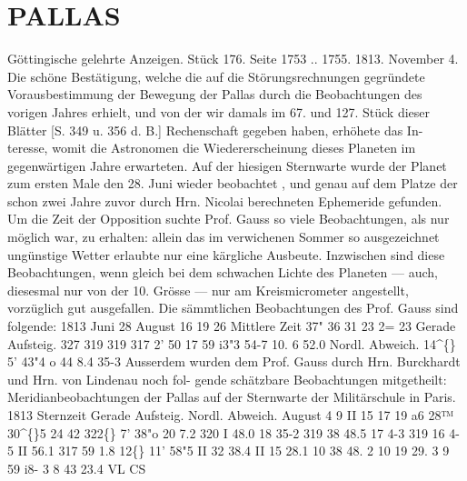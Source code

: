 \documentclass[12pt,a4paper]{article}
\newcommand{\degree}{\textdegree}
\begin{document}
\section*{PALLAS}
Göttingische  gelehrte  Anzeigen.     Stück  176.  Seite  1753  ..  1755.     1813.  November  4. 
Die  schöne  Bestätigung,  welche  die  auf  die  Störungsrechnungen  gegründete  Vorausbestimmung 
der  Bewegung  der  Pallas  durch  die  Beobachtungen  des  vorigen  Jahres  erhielt,  und  von  der  wir  damals 
im  67.  und  127.  Stück  dieser  Blätter  [S.  349  u.  356  d.  B.]  Rechenschaft  gegeben  haben,  erhöhete  das  In- 
teresse, womit  die  Astronomen  die  Wiedererscheinung  dieses  Planeten  im  gegenwärtigen  Jahre  erwarteten. 
Auf  der  hiesigen  Sternwarte  wurde  der  Planet  zum  ersten  Male  den  28.  Juni  wieder  beobachtet ,  und  genau 
auf  dem  Platze  der  schon  zwei  Jahre  zuvor  durch  Hrn.  Nicolai  berechneten  Ephemeride  gefunden.  Um  die 
Zeit  der  Opposition  suchte  Prof.  Gauss  so  viele  Beobachtungen,  als  nur  möglich  war,  zu  erhalten:  allein 
das  im  verwichenen  Sommer  so  ausgezeichnet  ungünstige  Wetter  erlaubte  nur  eine  kärgliche  Ausbeute. 
Inzwischen  sind  diese  Beobachtungen,  wenn  gleich  bei  dem  schwachen  Lichte  des  Planeten  ---  auch, 
diesesmal  nur  von  der  10.  Grösse  ---  nur  am  Kreismicrometer  angestellt,  vorzüglich  gut  ausgefallen. 
Die  sämmtlichen  Beobachtungen  des  Prof.  Gauss  sind  folgende: 
1813 
Juni       28 
August  16 
19 
26 
Mittlere  Zeit 
37" 
36 
31 
23 
2= 
23 
Gerade  Aufsteig. 
327 
319 
319 
317 
2' 
50 
17 
59 
i3"3 
54-7 
10.  6 
52.0 
Nordl.  Abweich. 
14\textasciicircum\{\} 
5'    43"4 
o 
44 
8.4 
35-3 
Ausserdem  wurden   dem  Prof.  Gauss   durch   Hrn.  Burckhardt   und  Hrn.  von  Lindenau  noch  fol- 
gende schätzbare  Beobachtungen  mitgetheilt: 
Meridianbeobachtungen  der  Pallas  auf  der  Sternwarte  der  Militärschule  in  Paris. 
1813  Sternzeit  Gerade  Aufsteig.    Nordl.  Abweich. 
August    4 
9 
II 
15 
17 19 
a6 
28™  30\textasciicircum\{\}5 
24     42 
322\degree\{\}     7'    38"o 
20 
7.2 
320 
I 
48.0 
18 
35-2 
319 
38 
48.5 
17 
4-3 
319 
16 
4-5 
II 
56.1 
317 
59 
1.8 
12\degree\{\}  11'  58"5 
II  32  38.4 
II  15  28.1 
10  38  48. 2 
10  19  29. 3 
9  59  i8-  3 
8  43  23.4 
VL 
CS 
\end{document}
